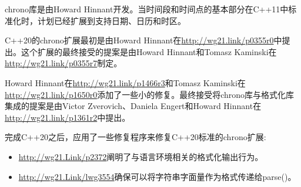 chrono库是由Howard Hinnant开发。当时间段和时间点的基本部分在C++11中标准化时，计划已经扩展到支持日期、日历和时区。

C++20的chrono扩展最初是由Howard Hinnant在\url{http://wg21.link/p0355r0}中提出。这个扩展的最终接受的提案是由Howard Hinnant和Tomasz Kaminski在\url{http://wg21.link/p0355r7}制定。

Howard Hinnant在\url{http://wg21.link/p1466r3}和Tomasz Kaminski在\url{http://wg21.link/p1650r0}添加了一些小的修复。最终接受将chrono库与格式化库集成的提案是由Victor Zverovich、Daniela Engert和Howard Hinnant在\url{http://wg21.link/p1361r2}中提出。

完成C++20之后，应用了一些修复程序来修复C++20标准的chrono扩展:

\begin{itemize}
\item
\url{http://wg21.Link/p2372}阐明了与语言环境相关的格式化输出行为。

\item
\url{http://wg21.Link/lwg3554}确保可以将字符串字面量作为格式传递给parse()。
\end{itemize}
